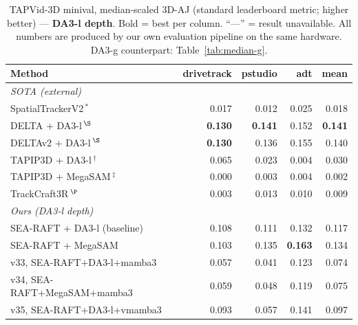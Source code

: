 \documentclass[11pt,a4paper]{article}
\begin{document}

\begin{table}[!ht]
\centering
\caption{TAPVid-3D minival, median-scaled 3D-AJ (standard leaderboard metric; higher better) ---
         \textbf{DA3-l depth}. Bold = best per column. ``---'' = result unavailable.
         All numbers are produced by our own evaluation pipeline on the same hardware.
         DA3-g counterpart: Table~\ref{tab:median-g}.}
\label{tab:median}
\footnotesize
\begin{tabular}{lrrrr}
\toprule
Method & drivetrack & pstudio & adt & mean \\
\midrule
\multicolumn{5}{l}{\emph{SOTA (external)}} \\
SpatialTrackerV2\,$^{*}$         & 0.017 & 0.012 & 0.025 & 0.018 \\
DELTA + DA3-l\,$^{\S}$             & \textbf{0.130} & \textbf{0.141} & 0.152 & \textbf{0.141} \\
DELTAv2 + DA3-l\,$^{\S}$           & \textbf{0.130} & 0.136 & 0.155 & 0.140 \\
TAPIP3D + DA3-l\,$^{\dagger}$      & 0.065 & 0.023 & 0.004 & 0.030 \\
TAPIP3D + MegaSAM\,$^{\ddagger}$ & 0.000 & 0.003 & 0.004 & 0.002 \\
TrackCraft3R\,$^{\P}$            & 0.003 & 0.013 & 0.010 & 0.009 \\
\midrule
\multicolumn{5}{l}{\emph{Ours (DA3-l depth)}} \\
SEA-RAFT + DA3-l (baseline)        & 0.108 & 0.111 & 0.132 & 0.117 \\
SEA-RAFT + MegaSAM               & 0.103 & 0.135 & \textbf{0.163} & 0.134 \\
v33, SEA-RAFT+DA3-l+mamba3            & 0.057 & 0.041 & 0.123 & 0.074 \\
v34, SEA-RAFT+MegaSAM+mamba3        & 0.059 & 0.048 & 0.119 & 0.075 \\
v35, SEA-RAFT+DA3-l+vmamba3               & 0.093 & 0.057 & 0.141 & 0.097 \\

\end{tabular}
\end{table}
\end{document}
